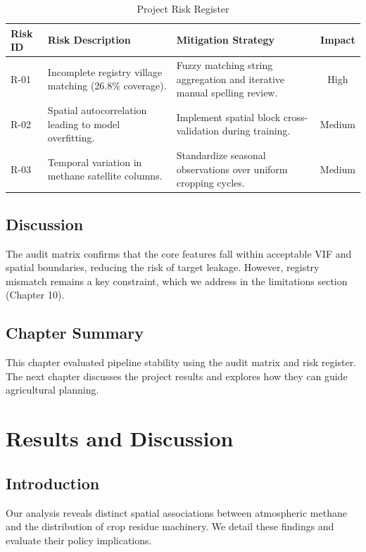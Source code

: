 \documentclass[12pt,a4paper]{report}
\begin{document}
\begin{table}[H]
\centering
\caption{Project Risk Register}
\label{tab:risk_register_detailed}
\begin{tabular}{lp{5.5cm}p{5.5cm}c}
\toprule
\textbf{Risk ID} & \textbf{Risk Description} & \textbf{Mitigation Strategy} & \textbf{Impact} \\
\midrule
R-01 & Incomplete registry village matching (26.8\% coverage). & Fuzzy matching string aggregation and iterative manual spelling review. & High \\
R-02 & Spatial autocorrelation leading to model overfitting. & Implement spatial block cross-validation during training. & Medium \\
R-03 & Temporal variation in methane satellite columns. & Standardize seasonal observations over uniform cropping cycles. & Medium \\
\bottomrule
\end{tabular}
\end{table}

\section{Discussion}
The audit matrix confirms that the core features fall within acceptable VIF and spatial boundaries, reducing the risk of target leakage. However, registry mismatch remains a key constraint, which we address in the limitations section (Chapter 10).

\section{Chapter Summary}
This chapter evaluated pipeline stability using the audit matrix and risk register. The next chapter discusses the project results and explores how they can guide agricultural planning.

\chapter{Results and Discussion}
\label{ch:results}

\section{Introduction}
Our analysis reveals distinct spatial associations between atmospheric methane and the distribution of crop residue machinery. We detail these findings and evaluate their policy implications.
\end{document}
